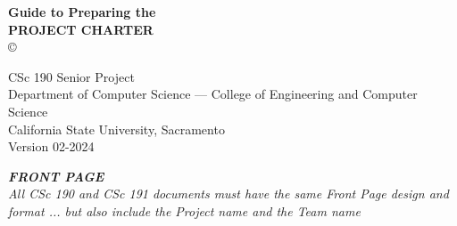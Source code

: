 \begin{tcolorbox}[
    colback = white,
    sharpish corners
]
    \setlength{\parskip}{\baselineskip}
    \setlength{\parindent}{0pt}
    
    \noindent
    \centering
    {
        \bfseries
        Guide to Preparing the      \\
        \uppercase{Project Charter}
    }
    \\
    {\copyright} \PreparerName

    CSc 190 Senior Project                      \\
    Department of Computer Science ---
    College of Engineering and Computer Science \\
    California State University, Sacramento     \\
    Version 02-2024


    {
        \bfseries
        \itshape
        \uppercase{Front Page}
    }
    \\
    {
        \itshape
        All CSc 190 and CSc 191 documents must have the same Front Page design
        and format ... but also include the Project name and the Team name
    }
\end{tcolorbox}